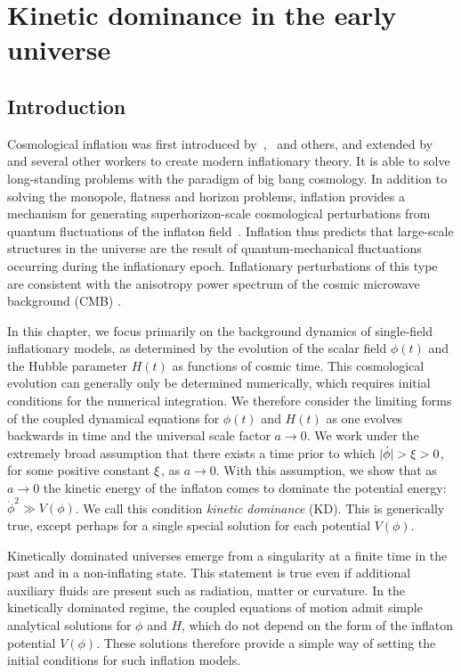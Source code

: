 \chapter{Kinetic dominance in the early universe}
\label{chp:kd}

\section{Introduction}

Cosmological inflation was first introduced by~\cite{starobinskii_spectrum_1979},~\cite{guth_inflationary_1981} and others, and extended by~\cite{linde_1982} and several other workers to create modern inflationary theory. It is able to solve long-standing problems with the paradigm of big bang cosmology. In addition to solving the monopole, flatness and horizon problems, inflation provides a mechanism for generating superhorizon-scale cosmological perturbations from quantum fluctuations of the inflaton field~\citep[see, for example][]{mukhanov_theory_1992}. Inflation thus predicts that large-scale structures in the universe are the result of quantum-mechanical fluctuations occurring during the inflationary epoch. Inflationary perturbations of this type are consistent with the anisotropy power spectrum of the cosmic microwave background (CMB) \citep{hinshaw_nine-year_2012,planck_collaboration_planck_2013}.

In this chapter, we focus primarily on the background dynamics of single-field inflationary models, as determined by the evolution of the scalar field \(\phi(t)\) and the Hubble parameter \(H(t)\) as functions of cosmic time.  This cosmological evolution can generally only be determined numerically, which requires initial conditions for the numerical integration.  We therefore consider the limiting forms of the coupled dynamical equations for \(\phi(t)\) and \(H(t)\) as one evolves backwards in time and the universal scale factor \(a\to 0\). We work under the extremely broad assumption that there exists a time prior to which \(|\dot{\phi}| > \xi > 0\), for some positive constant \(\xi\), as \(a \to 0\).  With this assumption, we show that as \(a\to 0\) the kinetic energy of the inflaton comes to dominate the potential energy: \(\dot{\phi}^2\gg V(\phi)\). We call this condition {\em kinetic dominance\/} (KD). This is generically true, except perhaps for a single special solution for each potential \(V(\phi)\).

Kinetically dominated universes emerge from a singularity at a finite time in the past and in a non-inflating state. This statement is true even if additional auxiliary fluids are present such as radiation, matter or curvature.  In the kinetically dominated regime, the coupled equations of motion admit simple analytical solutions for \(\phi\) and \(H\), which do not depend on the form of the inflaton potential \(V(\phi)\).  These solutions therefore provide a simple way of setting the initial conditions for such inflation models.

